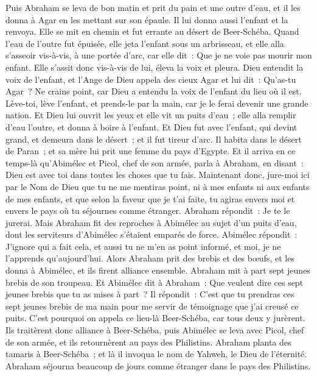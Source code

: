 \begin{multicols}{2}
Puis Abraham se leva de bon matin et prit du pain et une outre d'eau, et il les donna à Agar en les mettant sur son épaule. Il lui donna aussi l'enfant et la renvoya. Elle se mit en chemin et fut errante au désert de Beer-Schéba.
Quand l'eau de l'outre fut épuisée, elle jeta l'enfant sous un arbrisseau,
et elle alla s'asseoir vis-à-vis, à une portée d'arc, car elle dit~: Que je ne voie pas mourir mon enfant. Elle s'assit donc vis-à-vis de lui, éleva la voix et pleura.
Dieu entendit la voix de l'enfant, et l'Ange de Dieu appela des cieux Agar et lui dit~: Qu'as-tu Agar~? Ne crains point, car Dieu a entendu la voix de l'enfant du lieu où il est.
Lève-toi, lève l'enfant, et prends-le par la main, car je le ferai devenir une grande nation.
Et Dieu lui ouvrit les yeux et elle vit un puits d'eau~; elle alla remplir d'eau l'outre, et donna à boire à l'enfant.
Et Dieu fut avec l'enfant, qui devint grand, et demeura dans le désert~; et il fut tireur d'arc.
Il habita dans le désert de Paran~; et sa mère lui prit une femme du pays d'Egypte.
Et il arriva en ce temps-là qu'Abimélec et Picol, chef de son armée, parla à Abraham, en disant~: Dieu est avec toi dans toutes les choses que tu fais.
Maintenant donc, jure-moi ici par le Nom de Dieu que tu ne me mentiras point, ni à mes enfants ni aux enfants de mes enfants, et que selon la faveur que je t'ai faite, tu agiras envers moi et envers le pays où tu séjournes comme étranger.
Abraham répondit~: Je te le jurerai.
Mais Abraham fit des reproches à Abimélec au sujet d'un puits d'eau, dont les serviteurs d'Abimélec s'étaient emparés de force.
Abimélec répondit~: J'ignore qui a fait cela, et aussi tu ne m'en as point informé, et moi, je ne l'apprends qu'aujourd'hui.
Alors Abraham prit des brebis et des bœufs, et les donna à Abimélec, et ils firent alliance ensemble.
Abraham mit à part sept jeunes brebis de son troupeau.
Et Abimélec dit à Abraham~: Que veulent dire ces sept jeunes brebis que tu as mises à part~?
Il répondit~: C'est que tu prendras ces sept jeunes brebis de ma main pour me servir de témoignage que j'ai creusé ce puits.
C'est pourquoi on appela ce lieu-là Beer-Schéba, car tous deux y jurèrent.
Ils traitèrent donc alliance à Beer-Schéba, puis Abimélec se leva avec Picol, chef de son armée, et ils retournèrent au pays des Philistins.
Abraham planta des tamaris à Beer-Schéba~; et là il invoqua le nom de Yahweh, le Dieu de l'éternité.
Abraham séjourna beaucoup de jours comme étranger dans le pays des Philistins.

\end{multicols}
